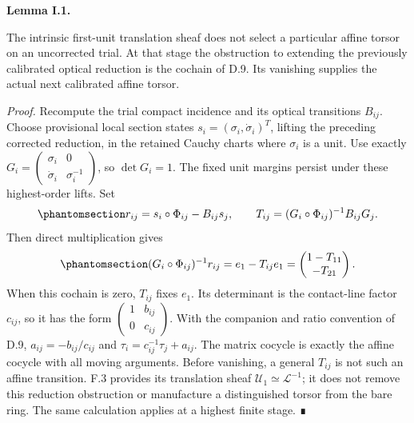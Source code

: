\documentclass[
  english,
  11pt,
  reqno]{amsart}
\makeatletter
\newcommand{\pandocstatementheading}[1]{%
  \par\addpenalty{\@beginparpenalty}%
  \addvspace{.5\baselineskip plus .2\baselineskip minus .2\baselineskip}%
  {\normalfont\bfseries #1\par}%
  \nobreak\@afterindenttrue\@afterheading
}
\makeatother
\begin{document}
\pandocstatementheading{\protect{}\label{lem:gg-preadmission-reduction}Lemma I.1.}

The intrinsic first-unit translation sheaf does not select a particular
affine torsor on an uncorrected trial. At that stage the obstruction to
extending the previously calibrated optical reduction is the cochain of
D.9. Its vanishing supplies the actual next calibrated affine torsor.

\emph{Proof.} Recompute the trial compact incidence and its optical
transitions \(B_{ij}\). Choose provisional local section states
\(s_i=(\sigma_i,\dot\sigma_i)^T\), lifting the preceding corrected
reduction, in the retained Cauchy charts where \(\sigma_i\) is a unit.
Use exactly
\(G_i=\left(\begin{smallmatrix}\sigma_i&0\\\dot\sigma_i&\sigma_i^{-1}\end{smallmatrix}\right)\),
so \(\det G_i=1\). The fixed unit margins persist under these
highest-order lifts. Set
\begin{equation}\protect\phantomsection\label{eq:gg-preadmission-actual-states}{
 r_{ij}=s_i\circ\Phi_{ij}-B_{ij}s_j,\qquad
 T_{ij}=(G_i\circ\Phi_{ij})^{-1}B_{ij}G_j .
}\end{equation} Then direct multiplication gives
\begin{equation}\protect\phantomsection\label{eq:gg-preadmission-exact-defect}{
 (G_i\circ\Phi_{ij})^{-1}r_{ij}
       =e_1-T_{ij}e_1
       =\begin{pmatrix}1-T_{11}\\-T_{21}\end{pmatrix}.
}\end{equation} When this cochain is zero, \(T_{ij}\) fixes \(e_1\). Its
determinant is the contact-line factor \(c_{ij}\), so it has the form
\(\left(\begin{smallmatrix}1&b_{ij}\\0&c_{ij}\end{smallmatrix}\right)\).
With the companion and ratio convention of D.9,
\(a_{ij}=-b_{ij}/c_{ij}\) and \(\tau_i=c_{ij}^{-1}\tau_j+a_{ij}\). The
matrix cocycle is exactly the affine cocycle with all moving arguments.
Before vanishing, a general \(T_{ij}\) is not such an affine transition.
F.3 provides its translation sheaf
\(\mathscr U_1\simeq\mathcal L^{-1}\); it does not remove this reduction
obstruction or manufacture a distinguished torsor from the bare ring.
The same calculation applies at a highest finite stage. ∎
\end{document}
